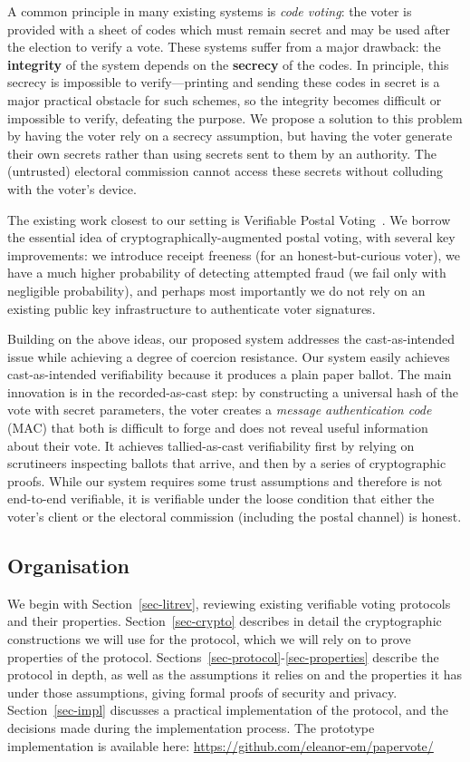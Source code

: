 \documentclass[12pt,a4paper]{article}
\theoremstyle{definition}
\begin{document}
A common principle in many existing systems is \textit{code voting}: the voter is provided with a sheet of codes which must remain secret and may be used after the election to verify a vote. These systems suffer from a major drawback: the \textbf{integrity} of the system depends on the \textbf{secrecy} of the codes. In principle, this secrecy is impossible to verify---printing and sending these codes in secret is a major practical obstacle for such schemes, so the integrity becomes difficult or impossible to verify, defeating the purpose. We propose a solution to this problem by having the voter rely on a secrecy assumption, but having the voter generate their own secrets rather than using secrets sent to them by an authority. The (untrusted) electoral commission cannot access these secrets without colluding with the voter's device.

The existing work closest to our setting is Verifiable Postal Voting~\cite{benaloh2013verifiable}. We borrow the essential idea of cryptographically-augmented postal voting, with several key improvements: we introduce receipt freeness (for an honest-but-curious voter), we have a much higher probability of detecting attempted fraud (we fail only with negligible probability), and perhaps most importantly we do not rely on an existing public key infrastructure to authenticate voter signatures.

Building on the above ideas, our proposed system addresses the cast-as-intended issue while achieving a degree of coercion resistance. Our system easily achieves cast-as-intended verifiability because it produces a plain paper ballot. The main innovation is in the recorded-as-cast step: by constructing a universal hash of the vote with secret parameters, the voter creates a \textit{message authentication code} (MAC) that both is difficult to forge and does not reveal useful information about their vote. It achieves tallied-as-cast verifiability first by relying on scrutineers inspecting ballots that arrive, and then by a series of cryptographic proofs. While our system requires some trust assumptions and therefore is not end-to-end verifiable, it is verifiable under the loose condition that either the voter's client or the electoral commission (including the postal channel) is honest.

\subsection{Organisation}
We begin with Section~\ref{sec-litrev}, reviewing existing verifiable voting protocols and their properties. Section~\ref{sec-crypto} describes in detail the cryptographic constructions we will use for the protocol, which we will rely on to prove properties of the protocol. Sections~\ref{sec-protocol}-\ref{sec-properties} describe the protocol in depth, as well as the assumptions it relies on and the properties it has under those assumptions, giving formal proofs of security and privacy. Section~\ref{sec-impl} discusses a practical implementation of the protocol, and the decisions made during the implementation process. The prototype implementation is available here: \url{https://github.com/eleanor-em/papervote/}
\end{document}
